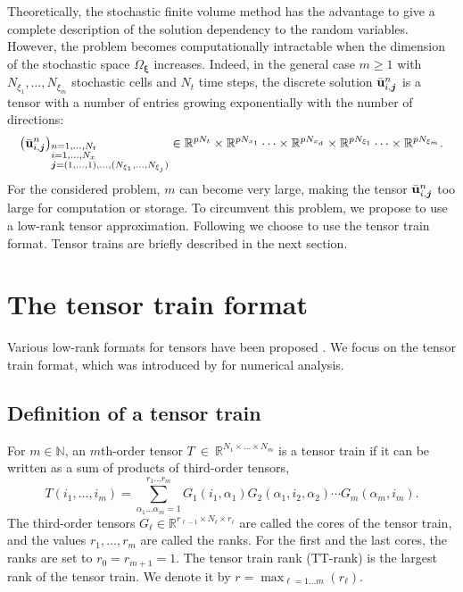 \documentclass{article}
\newcommand{\bfu}{ {\bf u} }
\newcommand{\ibfj}{ {\boldsymbol{j}  } }
\newcommand{\bfxi}{ {\bm \xi} }
\newcommand{\R}{ \mathbb R }
\begin{document}

Theoretically, the stochastic finite volume method has the advantage to give a complete description of the solution dependency to the random variables. 
However, the problem becomes computationally intractable when the dimension of the stochastic space $\Omega_\bfxi$ increases. 
Indeed, in the general case 
$m\geq 1$ with
$N_{\xi_1},\dots,N_{\xi_m}$ stochastic cells and $N_t$ time steps, 
the discrete solution $\bar \bfu_{i,\ibfj}^n $ is a tensor with a number of entries growing exponentially with the number of directions: 
\begin{equation}
    \left(\bar \bfu_{i,\ibfj}^n \right)_{
        \begin{subarray}{l}n=1,\dots,N_t \\
            i=1,\dots,N_x \\
            \ibfj = (1,\dots,1),\dots,(N_{\xi_1},\dots,N_{\xi_j})
            \end{subarray}
        }
    \in \R^{p N_t} \times 
    \R^{p N_{x_1}}   \dots \times \R^{p N_{x_d}} \times 
    \R^{p N_{\xi_1}} \dots \times \R^{p N_{\xi_m}}.
\end{equation}
For the considered problem, 
$m$ can become very large, making the tensor $\bar \bfu_{i,\ibfj}^n$ too large for computation or storage. 
To circumvent this problem, we propose to use a low-rank tensor approximation. 
Following \cite{walton_tensor-train_2024} we choose to use the tensor train format. 
Tensor trains are briefly described in the next section. 

\section{The tensor train format} \label{sec:TT}
Various low-rank formats for tensors have been proposed \cite{bachmayr_low-rank_2023}. 
We focus on the tensor train format, which was introduced by \cite{oseledets_tensor-train_2011} for numerical analysis.  

\subsection{Definition of a tensor train}
For $m \in \mathbb N$, an $m$th-order tensor $T~\in~\R^{N_1 \times \dots \times N_m}$ is a tensor train if it can be written as a sum of products of third-order tensors,
\begin{equation}
    T(i_1,\dots,i_m) 
    = \sum_{\alpha_1 \dots \alpha_m =1 }^{r_1 \dots r_m}
    G_1(i_1,\alpha_1) G_2(\alpha_1, i_2, \alpha_2) \cdots G_m(\alpha_m, i_m).
\end{equation}
The third-order tensors $G_\ell \in \R^{r_{\ell-1} \times N_\ell \times r_\ell}$ are called the cores of the tensor train, and the values $r_1,\dots,r_m$ are called the ranks.
For the first and the last cores, the ranks are set to $r_0=r_{m+1}=1$.
The tensor train rank (TT-rank) is the largest rank of the tensor train. We denote it by $r=\max_{\ell=1 \dots m}(r_\ell)$. 
\end{document}
